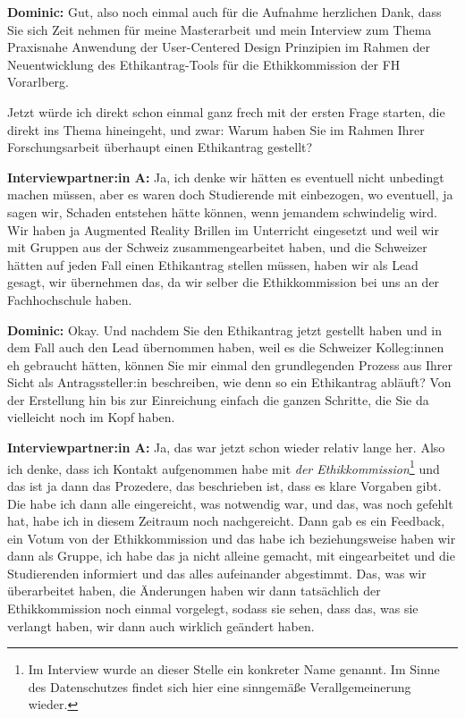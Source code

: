 \documentclass[a4paper,12pt,twoside]{scrreprt}
\begin{document}
\textbf{Dominic:} Gut, also noch einmal auch für die Aufnahme herzlichen Dank, dass Sie sich Zeit nehmen für meine Masterarbeit und mein Interview zum Thema Praxisnahe Anwendung der User-Centered Design Prinzipien im Rahmen der Neuentwicklung des Ethikantrag-Tools für die Ethikkommission der FH Vorarlberg.

Jetzt würde ich direkt schon einmal ganz frech mit der ersten Frage starten, die direkt ins Thema hineingeht, und zwar: Warum haben Sie im Rahmen Ihrer Forschungsarbeit überhaupt einen Ethikantrag gestellt?

\textbf{Interviewpartner:in A:} Ja, ich denke wir hätten es eventuell nicht unbedingt machen müssen, aber es waren doch Studierende mit einbezogen, wo eventuell, ja sagen wir, Schaden entstehen hätte können, wenn jemandem schwindelig wird. Wir haben ja Augmented Reality Brillen im Unterricht eingesetzt und weil wir mit Gruppen aus der Schweiz zusammengearbeitet haben, und die Schweizer hätten auf jeden Fall einen Ethikantrag stellen müssen, haben wir als Lead gesagt, wir übernehmen das, da wir selber die Ethikkommission bei uns an der Fachhochschule haben.

\textbf{Dominic:} Okay. Und nachdem Sie den Ethikantrag jetzt gestellt haben und in dem Fall auch den Lead übernommen haben, weil es die Schweizer Kolleg:innen eh gebraucht hätten, können Sie mir einmal den grundlegenden Prozess aus Ihrer Sicht als Antragssteller:in beschreiben, wie denn so ein Ethikantrag abläuft? Von der Erstellung hin bis zur Einreichung einfach die ganzen Schritte, die Sie da vielleicht noch im Kopf haben.

\textbf{Interviewpartner:in A:} Ja, das war jetzt schon wieder relativ lange her. Also ich denke, dass ich Kontakt aufgenommen habe mit \textit{der Ethikkommission}\footnote{Im Interview wurde an dieser Stelle ein konkreter Name genannt. Im Sinne des Datenschutzes findet sich hier eine sinngemäße Verallgemeinerung wieder.} und das ist ja dann das Prozedere, das beschrieben ist, dass es klare Vorgaben gibt. Die habe ich dann alle eingereicht, was notwendig war, und das, was noch gefehlt hat, habe ich in diesem Zeitraum noch nachgereicht. Dann gab es ein Feedback, ein Votum von der Ethikkommission und das habe ich beziehungsweise haben wir dann als Gruppe, ich habe das ja nicht alleine gemacht, mit eingearbeitet und die Studierenden informiert und das alles aufeinander abgestimmt. Das, was wir überarbeitet haben, die Änderungen haben wir dann tatsächlich der Ethikkommission noch einmal vorgelegt, sodass sie sehen, dass das, was sie verlangt haben, wir dann auch wirklich geändert haben.
\end{document}
